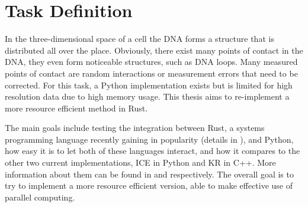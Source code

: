 %
%
%
%
%
%



\section{Task Definition}\label{sec:task}

In the three-dimensional space of a cell the DNA forms a structure that is
distributed all over the place. Obviously, there exist many points of contact
in the DNA, they even form noticeable structures, such as DNA loops. Many
measured points of contact are random interactions or measurement errors that
need to be corrected. For this task, a Python implementation exists but is
limited for high resolution data due to high memory usage. This thesis aims to
re-implement a more resource efficient method in Rust.

The main goals include testing the integration between Rust, a systems
programming language recently gaining in popularity (details in
), and Python, how easy it is to let both of these languages
interact, and how it compares to the other two current implementations, ICE in
Python and KR in C++. More information about them can be found in
 and  respectively. The overall goal is to
try to implement a more resource efficient version, able to make effective use
of parallel computing.

